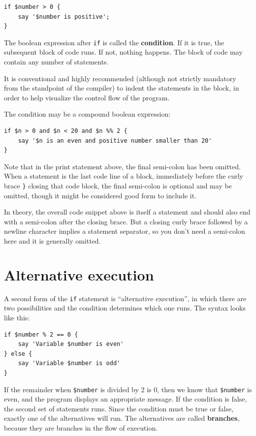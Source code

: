 \begin{verbatim}
if $number > 0 {
    say '$number is positive';
}
\end{verbatim}
%
The boolean expression after {\tt if} is
called the {\bf condition}.  If it is true, the subsequent 
block of code runs.  If not, nothing happens. The block of 
code may contain any number of statements.

It is conventional and highly recommended (although not 
strictly mandatory from the standpoint of the compiler) 
to indent the statements in the block, in order to help 
visualize the control flow of the program.

The condition may be a compound boolean expression:
\begin{verbatim}
if $n > 0 and $n < 20 and $n %% 2 {
    say '$n is an even and positive number smaller than 20'
}
\end{verbatim}
%
Note that in the print statement above, the final semi-colon 
has been omitted. When a statement is the last code line of 
a block, immediately before the curly brace {\tt \}} closing 
that code block, the final semi-colon is optional and may 
be omitted, though it might be considered good form to include it.

In theory, the overall code snippet above is itself a statement 
and should also end with a semi-colon after the closing brace. 
But a closing curly brace followed by a newline character implies a statement separator, so you don't need a semi-colon here and it is generally omitted.



\section{Alternative execution}
\label{alternative.execution}

A second form of the {\tt if} statement is ``alternative execution'',
in which there are two possibilities and the condition determines
which one runs.  The syntax looks like this:

\begin{verbatim}
if $number % 2 == 0 {
    say 'Variable $number is even'
} else {
    say 'Variable $number is odd'
}
\end{verbatim}
%
If the remainder when {\tt \$number} is divided by 2 is 0, 
then we know that {\tt \$number} is even, and the program 
displays an appropriate message.  If
the condition is false, the second set of statements runs.
Since the condition must be true or false, exactly one of the
alternatives will run.  The alternatives are called 
{\bf branches}, because they are branches in the flow of 
execution.

